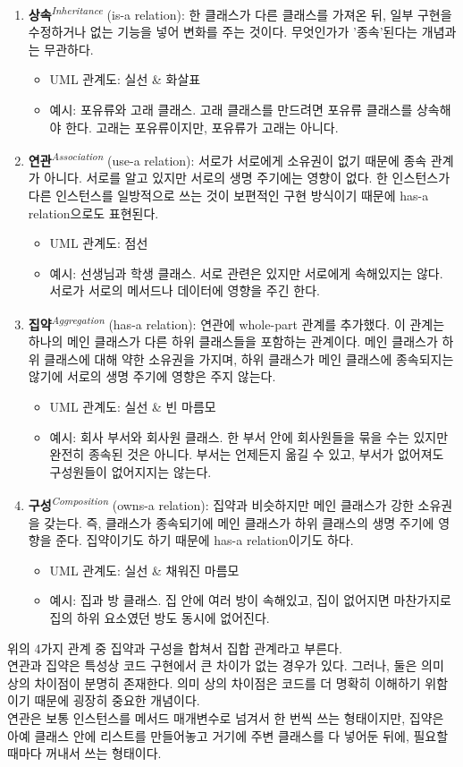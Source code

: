 \begin{enumerate}
\item \textbf{상속}\textit{\textsuperscript{Inheritance}} (is-a relation): 한 클래스가 다른 클래스를 가져온 뒤, 일부 구현을 수정하거나 없는 기능을 넣어 변화를 주는 것이다. 무엇인가가 '종속'된다는 개념과는 무관하다.
    \begin{itemize}
    \item UML 관계도: 실선 \& 화살표
    \item 예시: 포유류와 고래 클래스. 고래 클래스를 만드려면 포유류 클래스를 상속해야 한다. 고래는 포유류이지만, 포유류가 고래는 아니다.
    \end{itemize}
\item \textbf{연관}\textit{\textsuperscript{Association}} (use-a relation): 서로가 서로에게 소유권이 없기 때문에 종속 관계가 아니다. 서로를 알고 있지만 서로의 생명 주기에는 영향이 없다. 한 인스턴스가 다른 인스턴스를 일방적으로 쓰는 것이 보편적인 구현 방식이기 때문에 has-a relation으로도 표현된다.
    \begin{itemize}
    \item UML 관계도: 점선
    \item 예시: 선생님과 학생 클래스. 서로 관련은 있지만 서로에게 속해있지는 않다. 서로가 서로의 메서드나 데이터에 영향을 주긴 한다.
    \end{itemize}
\item \textbf{집약}\textit{\textsuperscript{Aggregation}} (has-a relation): 연관에 whole-part 관계를 추가했다. 이 관계는 하나의 메인 클래스가 다른 하위 클래스들을 포함하는 관계이다. 메인 클래스가 하위 클래스에 대해 약한 소유권을 가지며, 하위 클래스가 메인 클래스에 종속되지는 않기에 서로의 생명 주기에 영향은 주지 않는다.
    \begin{itemize}
    \item UML 관계도: 실선 \& 빈 마름모
    \item 예시: 회사 부서와 회사원 클래스. 한 부서 안에 회사원들을 묶을 수는 있지만 완전히 종속된 것은 아니다. 부서는 언제든지 옮길 수 있고, 부서가 없어져도 구성원들이 없어지지는 않는다.
    \end{itemize}
\item \textbf{구성}\textit{\textsuperscript{Composition}} (owns-a relation): 집약과 비슷하지만 메인 클래스가 강한 소유권을 갖는다. 즉, 클래스가 종속되기에 메인 클래스가 하위 클래스의 생명 주기에 영향을 준다. 집약이기도 하기 때문에 has-a relation이기도 하다.
    \begin{itemize}
    \item UML 관계도: 실선 \& 채워진 마름모
    \item 예시: 집과 방 클래스. 집 안에 여러 방이 속해있고, 집이 없어지면 마찬가지로 집의 하위 요소였던 방도 동시에 없어진다.
    \end{itemize}
\end{enumerate}

위의 4가지 관계 중 집약과 구성을 합쳐서 집합 관계라고 부른다.\\
연관과 집약은 특성상 코드 구현에서 큰 차이가 없는 경우가 있다. 그러나, 둘은 의미 상의 차이점이 분명히 존재한다. 의미 상의 차이점은 코드를 더 명확히 이해하기 위함이기 때문에 굉장히 중요한 개념이다.\\
연관은 보통 인스턴스를 메서드 매개변수로 넘겨서 한 번씩 쓰는 형태이지만, 집약은 아예 클래스 안에 리스트를 만들어놓고 거기에 주변 클래스를 다 넣어둔 뒤에, 필요할 때마다 꺼내서 쓰는 형태이다.
